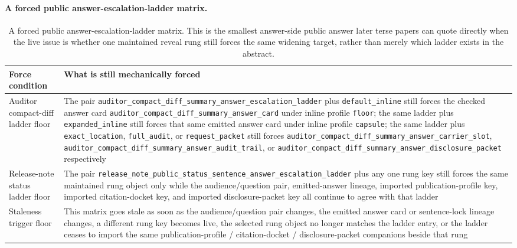 \documentclass[11pt]{article}
\begin{document}
\paragraph{A forced public answer-escalation-ladder matrix.}
\begin{table}[t]
\centering
\small
\begin{tabularx}{\linewidth}{@{}l X@{}}
\toprule
Force condition & What is still mechanically forced \\
\midrule
Auditor compact-diff ladder floor & The pair \nolinkurl{auditor_compact_diff_summary_answer_escalation_ladder} plus \nolinkurl{default_inline} still forces the checked answer card \nolinkurl{auditor_compact_diff_summary_answer_card} under inline profile \nolinkurl{floor}; the same ladder plus \nolinkurl{expanded_inline} still forces that same emitted answer card under inline profile \nolinkurl{capsule}; the same ladder plus \nolinkurl{exact_location}, \nolinkurl{full_audit}, or \nolinkurl{request_packet} still forces \nolinkurl{auditor_compact_diff_summary_answer_carrier_slot}, \nolinkurl{auditor_compact_diff_summary_answer_audit_trail}, or \nolinkurl{auditor_compact_diff_summary_answer_disclosure_packet} respectively \\
Release-note status ladder floor & The pair \nolinkurl{release_note_public_status_sentence_answer_escalation_ladder} plus any one rung key still forces the same maintained rung object only while the audience/question pair, emitted-answer lineage, imported publication-profile key, imported citation-docket key, and imported disclosure-packet key all continue to agree with that ladder \\
Staleness trigger floor & This matrix goes stale as soon as the audience/question pair changes, the emitted answer card or sentence-lock lineage changes, a different rung key becomes live, the selected rung object no longer matches the ladder entry, or the ladder ceases to import the same publication-profile / citation-docket / disclosure-packet companions beside that rung \\
\bottomrule
\end{tabularx}
\caption{A forced public answer-escalation-ladder matrix. This is the smallest answer-side public answer later terse papers can quote directly when the live issue is whether one maintained reveal rung still forces the same widening target, rather than merely which ladder exists in the abstract.}
\label{tab:forced-public-answer-escalation-ladder-matrix}
\end{table}
\end{document}
